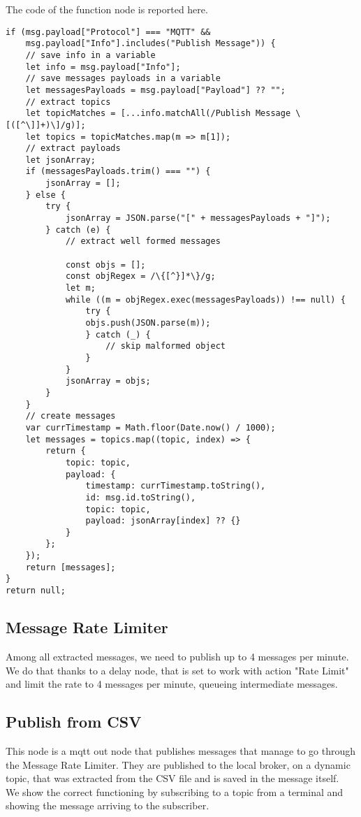 The code of the function node is reported here.
\begin{verbatim}
if (msg.payload["Protocol"] === "MQTT" && 
	msg.payload["Info"].includes("Publish Message")) {
    // save info in a variable
    let info = msg.payload["Info"];
    // save messages payloads in a variable
    let messagesPayloads = msg.payload["Payload"] ?? "";
    // extract topics
    let topicMatches = [...info.matchAll(/Publish Message \[([^\]]+)\]/g)];
    let topics = topicMatches.map(m => m[1]);
    // extract payloads
    let jsonArray;
    if (messagesPayloads.trim() === "") {
        jsonArray = [];
    } else {
        try {
            jsonArray = JSON.parse("[" + messagesPayloads + "]");
        } catch (e) {
            // extract well formed messages

            const objs = [];
            const objRegex = /\{[^}]*\}/g;
            let m;
            while ((m = objRegex.exec(messagesPayloads)) !== null) {
                try {
                objs.push(JSON.parse(m));
                } catch (_) {
                    // skip malformed object
                }
            }
            jsonArray = objs;
        }
    }
    // create messages 
    var currTimestamp = Math.floor(Date.now() / 1000);
    let messages = topics.map((topic, index) => {
        return {
            topic: topic, 
            payload: {
                timestamp: currTimestamp.toString(),
                id: msg.id.toString(),
                topic: topic,
                payload: jsonArray[index] ?? {}
            }
        };
    });
    return [messages];
}
return null;
\end{verbatim}

\subsection{Message Rate Limiter}
Among all extracted messages, we need to publish up to 4 messages per minute. We do that thanks to a delay node, that is set to work with action "Rate Limit" and limit the rate to 4 messages per minute, queueing intermediate messages.  

\subsection{Publish from CSV}
This node is a mqtt out node that publishes messages that manage to go through the Message Rate Limiter. They are published to the local broker, on a dynamic topic, that was extracted from the CSV file and is saved in the message itself.\\
We show the correct functioning by subscribing to a topic from a terminal and showing the message arriving to the subscriber.

